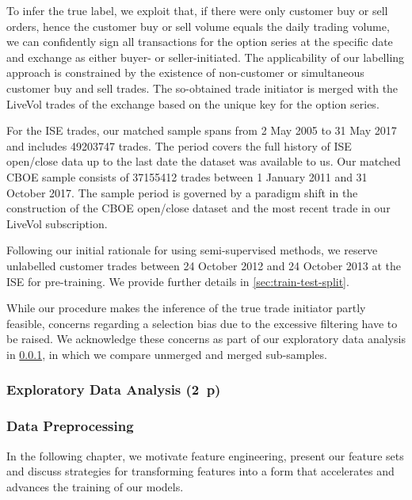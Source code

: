 To infer the true label, we exploit that, if there were only customer buy or sell orders, hence the customer buy or sell volume equals the daily trading volume, we can confidently sign all transactions for the option series at the specific date and exchange as either buyer- or seller-initiated. The applicability of our labelling approach is constrained by the existence of non-customer or simultaneous customer buy and sell trades. The so-obtained trade initiator is merged with the LiveVol trades of the exchange based on the unique key for the option series.

For the \gls{ISE} trades, our matched sample spans from 2 May 2005 to 31 May 2017 and includes \num{49203747} trades. The period covers the full history of \gls{ISE} open/close data up to the last date the dataset was available to us. Our matched \gls{CBOE} sample consists of \num{37155412} trades between 1 January 2011 and 31 October 2017. The sample period is governed by a paradigm shift in the construction of the \gls{CBOE} open/close dataset and the most recent trade in our LiveVol subscription.

Following our initial rationale for using semi-supervised methods, we reserve unlabelled customer trades between 24 October 2012 and 24 October 2013 at the \gls{ISE} for pre-training. We provide further details in \cref{sec:train-test-split}.

While our procedure makes the inference of the true trade initiator partly feasible, concerns regarding a selection bias due to the excessive filtering have to be raised. We acknowledge these concerns as part of our exploratory data analysis in \cref{sec:exploratory-data-analysis}, in which we compare unmerged and merged sub-samples.

\subsubsection{Exploratory Data Analysis (2~p)}\label{sec:exploratory-data-analysis}

\subsubsection{Data Preprocessing}\label{sec:data-preprocessing}

In the following chapter, we motivate feature engineering, present our feature sets and discuss strategies for transforming features into a form that accelerates and advances the training of our models.

